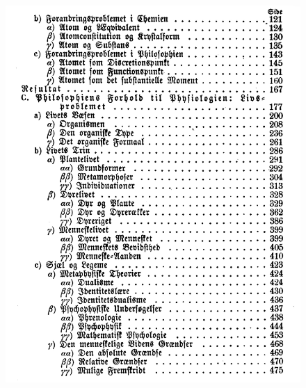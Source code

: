 \documentclass[ignorenonframetext, ]{beamer}
\begin{document}
\begin{frame}

\begin{figure}
\centering
\includegraphics[scale=0.5]{prop3.jpg}

\end{figure}
\end{frame}
\end{document}
